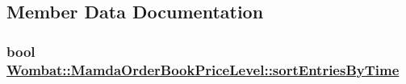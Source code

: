 \subsection{Member Data Documentation}
\hypertarget{classWombat_1_1MamdaOrderBookPriceLevel_320d6fa10c3fce860299af5e77cefe44}{
\subsubsection[sortEntriesByTime]{\setlength{\rightskip}{0pt plus 5cm}bool \hyperlink{classWombat_1_1MamdaOrderBookPriceLevel_320d6fa10c3fce860299af5e77cefe44}{Wombat::Mamda\-Order\-Book\-Price\-Level::sort\-Entries\-By\-Time}}}
\label{classWombat_1_1MamdaOrderBookPriceLevel_320d6fa10c3fce860299af5e77cefe44}


